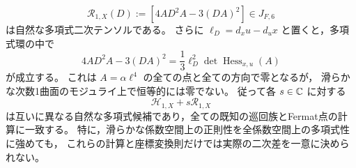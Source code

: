 \begin{proposition}
\label{prop:ku-d1-polynomial-covariant-ambiguity}
\begin{equation}\label{eq:ku-d1-hidden-covariant}
 \mathcal R_{1,X}(D):=\left[4A D^2A-3(DA)^2\right]\in J_{F,6}
\end{equation}
は自然な多項式二次テンソルである。
さらに $\ell_D=d_xu-d_ux$ と置くと，多項式環の中で
\begin{equation}\label{eq:ku-d1-hidden-covariant-binary-hessian}
 4A D^2A-3(DA)^2
 =\frac13\ell_D^2\det\operatorname{Hess}_{x,u}(A)
\end{equation}
が成立する。
これは $A=\alpha\ell^4$ の全ての点と全ての方向で零となるが，
滑らかな次数1曲面のモジュライ上で恒等的には零でない。
従って各 $s\in\mathbb C$ に対する
\[
                  \mathcal H_{1,X}+s\mathcal R_{1,X}
\]
は互いに異なる自然な多項式候補であり，全ての既知の巡回族とFermat点の計算に一致する。
特に，滑らかな係数空間上の正則性を全係数空間上の多項式性に強めても，
これらの計算と座標変換則だけでは実際の二次差を一意に決められない。
\end{proposition}
